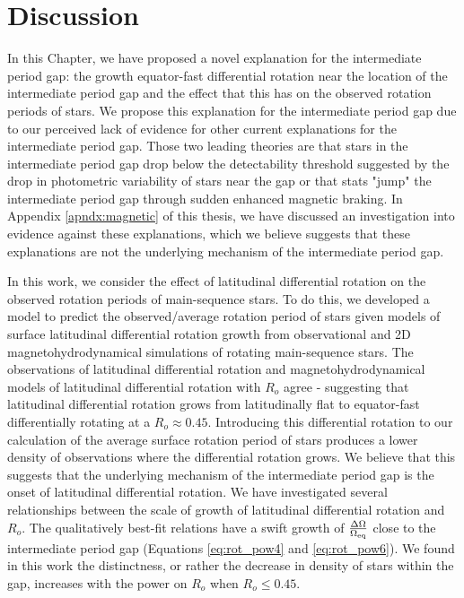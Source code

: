 \section{Discussion}
\label{sec:discussion}

In this Chapter, we have proposed a novel explanation for the intermediate period gap: the growth equator-fast differential rotation near the location of the intermediate period gap and the effect that this has on the observed rotation periods of stars.
We propose this explanation for the intermediate period gap due to our perceived lack of evidence for other current explanations for the intermediate period gap.
Those two leading theories are that stars in the intermediate period gap drop below the detectability threshold suggested by the drop in photometric variability of stars near the gap or that stats "jump" the intermediate period gap through sudden enhanced magnetic braking.
In Appendix \ref{apndx:magnetic} of this thesis, we have discussed an investigation into evidence against these explanations, which we believe suggests that these explanations are not the underlying mechanism of the intermediate period gap.

In this work, we consider the effect of latitudinal differential rotation on the observed rotation periods of main-sequence stars.
To do this, we developed a model to predict the observed/average rotation period of stars given models of surface latitudinal differential rotation growth from observational and 2D magnetohydrodynamical simulations of rotating main-sequence stars.
The observations of latitudinal differential rotation and magnetohydrodynamical models of latitudinal differential rotation with $R_o$ agree - suggesting that latitudinal differential rotation grows from latitudinally flat to equator-fast differentially rotating at a $R_o \approx 0.45$.
Introducing this differential rotation to our calculation of the average surface rotation period of stars produces a lower density of observations where the differential rotation grows.
We believe that this suggests that the underlying mechanism of the intermediate period gap is the onset of latitudinal differential rotation.
We have investigated several relationships between the scale of growth of latitudinal differential rotation and $R_o$. The qualitatively best-fit relations have a swift growth of $\frac{\Delta\Omega}{\Omega_{\rm{eq}}}$ close to the intermediate period gap (Equations \ref{eq:rot_pow4} and \ref{eq:rot_pow6}).
We found in this work the distinctness, or rather the decrease in density of stars within the gap, increases with the power on $R_o$ when $R_o \leq 0.45$.

